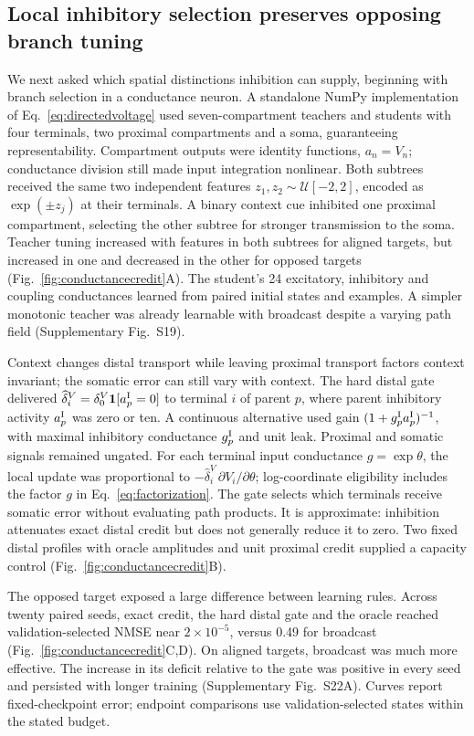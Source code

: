 \documentclass[11pt]{article}
\begin{document}
\subsection*{Local inhibitory selection preserves opposing branch tuning}

We next asked which spatial distinctions inhibition can supply, beginning with branch selection in a conductance neuron. A standalone NumPy implementation of Eq.~\ref{eq:directedvoltage} used seven-compartment teachers and students with four terminals, two proximal compartments and a soma, guaranteeing representability. Compartment outputs were identity functions, $a_n=V_n$; conductance division still made input integration nonlinear. Both subtrees received the same two independent features $z_1,z_2\sim\mathcal U[-2,2]$, encoded as $\exp(\pm z_j)$ at their terminals. A binary context cue inhibited one proximal compartment, selecting the other subtree for stronger transmission to the soma. Teacher tuning increased with features in both subtrees for aligned targets, but increased in one and decreased in the other for opposed targets (Fig.~\ref{fig:conductancecredit}A). The student's 24 excitatory, inhibitory and coupling conductances learned from paired initial states and examples. A simpler monotonic teacher was already learnable with broadcast despite a varying path field (Supplementary Fig.~S19).

Context changes distal transport while leaving proximal transport factors context invariant; the somatic error can still vary with context. The hard distal gate delivered $\widehat\delta^V_i=\delta^V_0\mathbf1[a_p^{\rm I}=0]$ to terminal $i$ of parent $p$, where parent inhibitory activity $a_p^{\rm I}$ was zero or ten. A continuous alternative used gain $(1+g_p^{\rm I}a_p^{\rm I})^{-1}$, with maximal inhibitory conductance $g_p^{\rm I}$ and unit leak. Proximal and somatic signals remained ungated. For each terminal input conductance $g=\exp\theta$, the local update was proportional to $-\widehat\delta_i^V\,\partial V_i/\partial\theta$; log-coordinate eligibility includes the factor $g$ in Eq.~\ref{eq:factorization}. The gate selects which terminals receive somatic error without evaluating path products. It is approximate: inhibition attenuates exact distal credit but does not generally reduce it to zero. Two fixed distal profiles with oracle amplitudes and unit proximal credit supplied a capacity control (Fig.~\ref{fig:conductancecredit}B).

The opposed target exposed a large difference between learning rules. Across twenty paired seeds, exact credit, the hard distal gate and the oracle reached validation-selected NMSE near $2\times10^{-5}$, versus 0.49 for broadcast (Fig.~\ref{fig:conductancecredit}C,D). On aligned targets, broadcast was much more effective. The increase in its deficit relative to the gate was positive in every seed and persisted with longer training (Supplementary Fig.~S22A). Curves report fixed-checkpoint error; endpoint comparisons use validation-selected states within the stated budget.
\end{document}
